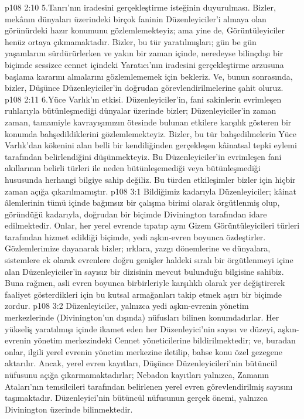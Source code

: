 \vs p108 2:10 5.\bibnobreakspace Tanrı’nın iradesini gerçekleştirme isteğinin duyurulması. Bizler, mekânın dünyaları üzerindeki birçok faninin Düzenleyiciler’i almaya olan görünürdeki hazır konumunu gözlemlemekteyiz; ama yine de, Görüntüleyiciler henüz ortaya çıkmamaktadır. Bizler, bu tür yaratılmışları; gün be gün yaşamlarını sürdürürlerken ve yakın bir zaman içinde, neredeyse bilinçdışı bir biçimde sessizce cennet içindeki Yaratıcı’nın iradesini gerçekleştirme arzusuna başlama kararını almalarını gözlemlememek için bekleriz. Ve, bunun sonrasında, bizler, Düşünce Düzenleyiciler’in doğrudan görevlendirilmelerine şahit oluruz.
\vs p108 2:11 6.\bibnobreakspace Yüce Varlık’ın etkisi. Düzenleyiciler’in, fani sakinlerin evrimleşen ruhlarıyla bütünleşmediği dünyalar üzerinde bizler; Düzenleyiciler’in zaman zaman, tamamiyle kavrayışımızın ötesinde bulunan etkilere karşılık gösteren bir konumda bahşedildiklerini gözlemlemekteyiz. Bizler, bu tür bahşedilmelerin Yüce Varlık’dan kökenini alan belli bir kendiliğinden gerçekleşen kâinatsal tepki eylemi tarafından belirlendiğini düşünmekteyiz. Bu Düzenleyiciler’in evrimleşen fani akıllarının belirli türleri ile neden bütünleşemediği veya bütünleşmediği hususunda herhangi bilgiye sahip değiliz. Bu türden etkileşimler bizler için hiçbir zaman açığa çıkarılmamıştır.
\vs p108 3:1 Bildiğimiz kadarıyla Düzenleyiciler; kâinat âlemlerinin tümü içinde bağımsız bir çalışma birimi olarak örgütlenmiş olup, göründüğü kadarıyla, doğrudan bir biçimde Divinington tarafından idare edilmektedir. Onlar, her yerel evrende tıpatıp aynı Gizem Görüntüleyicileri türleri tarafından hizmet edildiği biçimde, yedi aşkın\hyp{}evren boyunca özdeştirler. Gözlemlerimize dayanarak bizler; ırklara, yazgı dönemlerine ve dünyalara, sistemlere ek olarak evrenlere doğru genişler haldeki sıralı bir örgütlenmeyi içine alan Düzenleyiciler’in sayısız bir dizisinin mevcut bulunduğu bilgisine sahibiz. Buna rağmen, asli evren boyunca birbirleriyle karşılıklı olarak yer değiştirerek faaliyet gösterdikleri için bu kutsal armağanları takip etmek aşırı bir biçimde zordur.
\vs p108 3:2 Düzenleyiciler, yalnızca yedi aşkın\hyp{}evrenin yönetim merkezlerinde (Divinington’un dışında) nüfusları bilinen konumdadırlar. Her yükseliş yaratılmışı içinde ikamet eden her Düzenleyici’nin sayısı ve düzeyi, aşkın\hyp{}evrenin yönetim merkezindeki Cennet yöneticilerine bildirilmektedir; ve, buradan onlar, ilgili yerel evrenin yönetim merkezine iletilip, bahse konu özel gezegene aktarılır. Ancak, yerel evren kayıtları, Düşünce Düzenleyicileri’nin bütüncül nüfusunu açığa çıkarmamaktadırlar; Nebadon kayıtları yalnızca, Zamanın Ataları’nın temsilcileri tarafından belirlenen yerel evren görevlendirilmiş sayısını taşımaktadır. Düzenleyici’nin bütüncül nüfusunun gerçek önemi, yalnızca Divinington üzerinde bilinmektedir.
